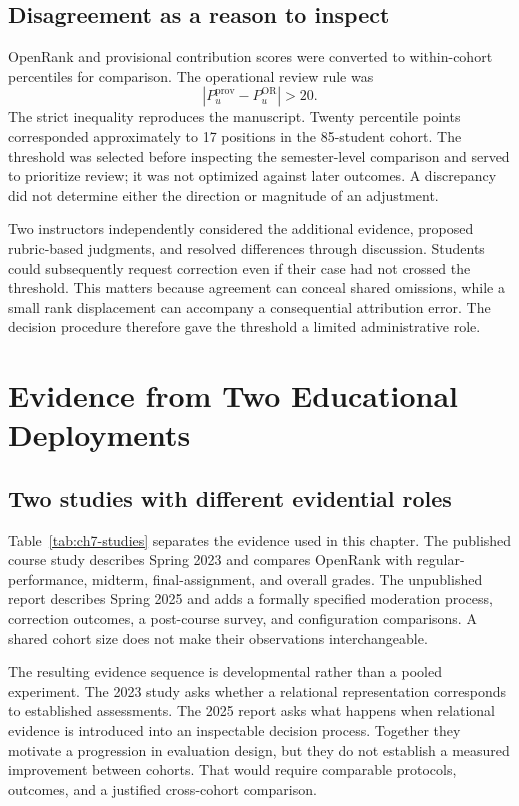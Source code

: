 \subsection{Disagreement as a reason to inspect}
OpenRank and provisional contribution scores were converted to within-cohort percentiles for comparison. The operational review rule was
\begin{equation}
\left|P^{\mathrm{prov}}_u-P^{\mathrm{OR}}_u\right|>20.
\label{eq:ch7-trigger}
\end{equation}
The strict inequality reproduces the manuscript. Twenty percentile points corresponded approximately to 17 positions in the 85-student cohort. The threshold was selected before inspecting the semester-level comparison and served to prioritize review; it was not optimized against later outcomes. A discrepancy did not determine either the direction or magnitude of an adjustment.

Two instructors independently considered the additional evidence, proposed rubric-based judgments, and resolved differences through discussion. Students could subsequently request correction even if their case had not crossed the threshold. This matters because agreement can conceal shared omissions, while a small rank displacement can accompany a consequential attribution error. The decision procedure therefore gave the threshold a limited administrative role.

\section{Evidence from Two Educational Deployments}
\label{sec:ch7-evidence}

\subsection{Two studies with different evidential roles}
Table~\ref{tab:ch7-studies} separates the evidence used in this chapter. The published course study describes Spring 2023 and compares OpenRank with regular-performance, midterm, final-assignment, and overall grades. The unpublished report describes Spring 2025 and adds a formally specified moderation process, correction outcomes, a post-course survey, and configuration comparisons. A shared cohort size does not make their observations interchangeable.



The resulting evidence sequence is developmental rather than a pooled experiment. The 2023 study asks whether a relational representation corresponds to established assessments. The 2025 report asks what happens when relational evidence is introduced into an inspectable decision process. Together they motivate a progression in evaluation design, but they do not establish a measured improvement between cohorts. That would require comparable protocols, outcomes, and a justified cross-cohort comparison.


